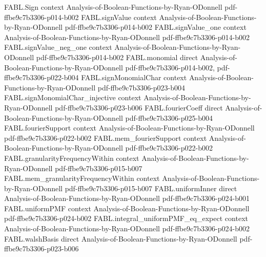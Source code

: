 \begin{theorem}
\label{FABL.FiniteFourierBasis.fourierCoeff_sum}
\leanok
{}
\proofstep
  {FABL.Sign}
  {context}
  {Analysis-of-Boolean-Functions-by-Ryan-ODonnell}
  {pdf-ffbe9c7b3306-p014-b002}
\proofstep
  {FABL.signValue}
  {context}
  {Analysis-of-Boolean-Functions-by-Ryan-ODonnell}
  {pdf-ffbe9c7b3306-p014-b002}
\proofstep
  {FABL.signValue_one}
  {context}
  {Analysis-of-Boolean-Functions-by-Ryan-ODonnell}
  {pdf-ffbe9c7b3306-p014-b002}
\proofstep
  {FABL.signValue_neg_one}
  {context}
  {Analysis-of-Boolean-Functions-by-Ryan-ODonnell}
  {pdf-ffbe9c7b3306-p014-b002}
\proofstep
  {FABL.monomial}
  {direct}
  {Analysis-of-Boolean-Functions-by-Ryan-ODonnell}
  {pdf-ffbe9c7b3306-p014-b002,
    pdf-ffbe9c7b3306-p022-b004}
\proofstep
  {FABL.signMonomialChar}
  {context}
  {Analysis-of-Boolean-Functions-by-Ryan-ODonnell}
  {pdf-ffbe9c7b3306-p023-b004}
\proofstep
  {FABL.signMonomialChar_injective}
  {context}
  {Analysis-of-Boolean-Functions-by-Ryan-ODonnell}
  {pdf-ffbe9c7b3306-p023-b006}
\proofstep
  {FABL.fourierCoeff}
  {direct}
  {Analysis-of-Boolean-Functions-by-Ryan-ODonnell}
  {pdf-ffbe9c7b3306-p025-b004}
\proofstep
  {FABL.fourierSupport}
  {context}
  {Analysis-of-Boolean-Functions-by-Ryan-ODonnell}
  {pdf-ffbe9c7b3306-p022-b002}
\proofstep
  {FABL.mem_fourierSupport}
  {context}
  {Analysis-of-Boolean-Functions-by-Ryan-ODonnell}
  {pdf-ffbe9c7b3306-p022-b002}
\proofstep
  {FABL.granularityFrequencyWithin}
  {context}
  {Analysis-of-Boolean-Functions-by-Ryan-ODonnell}
  {pdf-ffbe9c7b3306-p015-b007}
\proofstep
  {FABL.mem_granularityFrequencyWithin}
  {context}
  {Analysis-of-Boolean-Functions-by-Ryan-ODonnell}
  {pdf-ffbe9c7b3306-p015-b007}
\proofstep
  {FABL.uniformInner}
  {direct}
  {Analysis-of-Boolean-Functions-by-Ryan-ODonnell}
  {pdf-ffbe9c7b3306-p024-b001}
\proofstep
  {FABL.uniformPMF}
  {context}
  {Analysis-of-Boolean-Functions-by-Ryan-ODonnell}
  {pdf-ffbe9c7b3306-p024-b002}
\proofstep
  {FABL.integral_uniformPMF_eq_expect}
  {context}
  {Analysis-of-Boolean-Functions-by-Ryan-ODonnell}
  {pdf-ffbe9c7b3306-p024-b002}
\proofstep
  {FABL.walshBasis}
  {direct}
  {Analysis-of-Boolean-Functions-by-Ryan-ODonnell}
  {pdf-ffbe9c7b3306-p023-b006}

\end{theorem}
